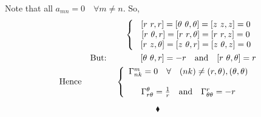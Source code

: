 Note that all $a_{mn} = 0 \quad \forall m\ne n$. So,
\begin{align}
\left \{ \begin{array}{c}
\ [r \ r,r]=[\theta \  \theta, \theta] = [z \ z,z] = 0\\
\ [r \ \theta,r]=[r \ r, \theta] = [r \ r,z] = 0\\
\ [r \ z,\theta]=[z \  \theta, r] = [z \ \theta,z] = 0\\
\end{array}\right.\\
\text{But:}\quad\quad\quad\quad [\theta \ \theta,r]= -r \quad\text{and}\quad [r \  \theta, \theta] = r\\
\text{Hence}\quad\quad\quad\quad \left \{ \begin{array}{c}
\Gamma^m_{nk} = 0 \quad\forall\quad (nk) \ne (r, \theta), (\theta, \theta)\\\\
\Gamma^{\theta}_{r\theta} = \frac{1}{r} \quad\text{and}\quad \Gamma^r_{\theta\theta} = -r
\end{array}\right.\
\end{align}

$$\blacklozenge$$
\newpage


